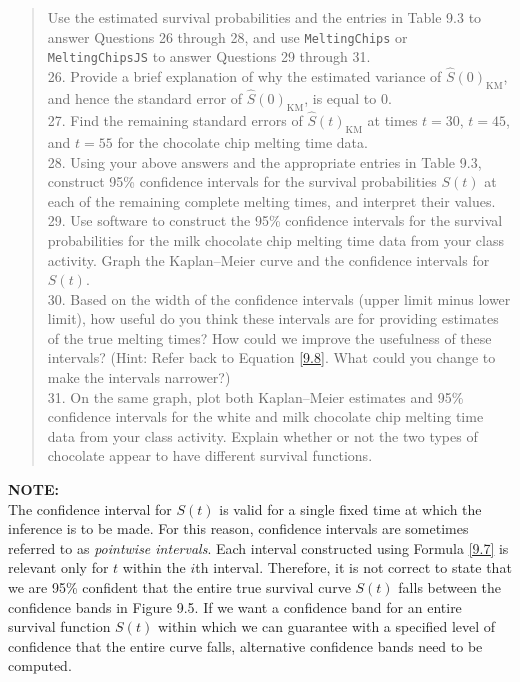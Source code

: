 \documentclass[
]{report}
\begin{document}
\begin{quote}
Use the estimated survival probabilities and the entries in Table 9.3 to answer Questions 26 through 28, and use \texttt{MeltingChips} or \texttt{MeltingChipsJS} to answer Questions 29 through 31.\\
26. Provide a brief explanation of why the estimated variance of \(\hat S(0)_{\mathrm{KM}}\), and hence the standard error of \(\hat S(0)_{\mathrm{KM}}\), is equal to 0.\\
27. Find the remaining standard errors of \(\hat S(t)_{\mathrm{KM}}\) at times \(t = 30\), \(t = 45\), and \(t = 55\) for the chocolate chip melting time data.\\
28. Using your above answers and the appropriate entries in Table 9.3, construct 95\% confidence intervals for the survival probabilities \(S(t)\) at each of the remaining complete melting times, and interpret their values.\\
29. Use software to construct the 95\% confidence intervals for the survival probabilities for the milk chocolate chip melting time data from your class activity. Graph the Kaplan--Meier curve and the confidence intervals for \(S(t)\).\\
30. Based on the width of the confidence intervals (upper limit minus lower limit), how useful do you think these intervals are for providing estimates of the true melting times? How could we improve the usefulness of these intervals? (Hint: Refer back to Equation \ref{9.8}. What could you change to make the intervals narrower?)\\
31. On the same graph, plot both Kaplan--Meier estimates and 95\% confidence intervals for the white and milk chocolate chip melting time data from your class activity. Explain whether or not the two types of chocolate appear to have different survival functions.
\end{quote}

\large

\textbf{NOTE:}\\
The confidence interval for \(S(t)\) is valid for a single fixed time at which the inference is to be made. For this reason, confidence intervals are sometimes referred to as \emph{pointwise intervals}. Each interval constructed using Formula \ref{9.7} is relevant only for \(t\) within the \(i\)th interval. Therefore, it is not correct to state that we are 95\% confident that the entire true survival curve \(S(t)\) falls between the confidence bands in Figure 9.5. If we want a confidence band for an entire survival function \(S(t)\) within which we can guarantee with a specified level of confidence that the entire curve falls, alternative confidence bands need to be computed.\\
\normalsize
\end{document}
